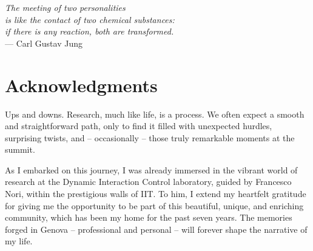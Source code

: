 
\cleardoublepage

{}

\vspace*{-1.4cm}
\begin{addmargin}{-1.0cm}

\begin{flushright}
    \textsl{\onehalfspacing
    The meeting of two personalities \\
    is like the contact of two chemical substances:\\
    if there is any reaction, both are transformed.}\\
    --- Carl Gustav Jung
\end{flushright}

\bigskip

\begingroup
{}

\let\cleardoublepage\relax

\vspace*{-0.7cm}
\chapter*{Acknowledgments}
\vspace*{-0.6cm}

Ups and downs. Research, much like life, is a process.
We often expect a smooth and straightforward path, only to find it filled with unexpected hurdles, surprising twists, and -- occasionally -- those truly remarkable moments at the summit.

As I embarked on this journey, I was already immersed in the vibrant world of research at the Dynamic Interaction Control laboratory, guided by Francesco Nori, within the prestigious walls of {\small IIT}.
To him, I extend my heartfelt gratitude for giving me the opportunity to be part of this beautiful, unique, and enriching community, which has been my home for the past seven years.
The memories forged in Genova -- professional and personal -- will forever shape the narrative of my life.


\end{addmargin}
